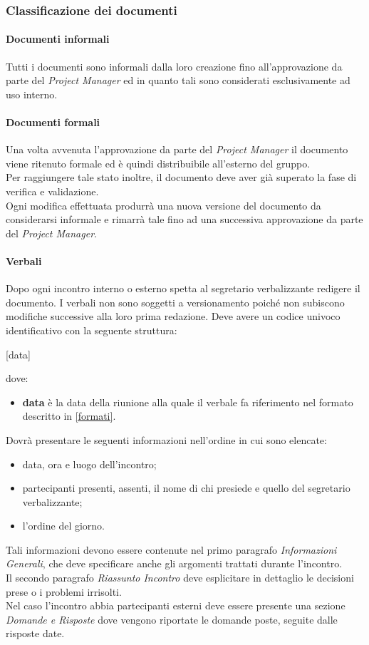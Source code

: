 	\subsubsection{Classificazione dei documenti}
		\paragraph{Documenti informali}\Spazio
		Tutti i documenti sono informali dalla loro creazione fino all'approvazione da parte del \emph{Project Manager} ed in quanto tali sono considerati esclusivamente ad uso interno.
		\paragraph{Documenti formali}\Spazio
		Una volta avvenuta l'approvazione da parte del \emph{Project Manager} il documento viene ritenuto formale ed è quindi distribuibile all'esterno del gruppo.\\
		Per raggiungere tale stato inoltre, il documento deve aver già superato la fase di verifica e validazione. \\
Ogni modifica effettuata produrrà una nuova versione del documento da considerarsi informale e rimarrà tale fino ad una successiva approvazione da parte del \emph{Project Manager}.
		\paragraph{Verbali}\Spazio
		Dopo ogni incontro interno o esterno spetta al segretario verbalizzante redigere il documento. I verbali non sono soggetti a versionamento poiché non subiscono modifiche successive alla loro prima redazione. Deve avere un codice univoco identificativo con la seguente struttura: 
		\newline
		\centerline{[data]} 
		dove: 
    \begin{itemize} 
\item \textbf{data} è la data della riunione alla quale il verbale fa riferimento nel formato descritto in \ref{formati}. 
\end{itemize}
Dovrà presentare le seguenti informazioni nell'ordine in cui sono elencate:
\begin{itemize}
\item data, ora e luogo dell'incontro;
\item partecipanti presenti, assenti, il nome di chi presiede e quello del segretario verbalizzante;
\item l'ordine del giorno.
\end{itemize}
Tali informazioni devono essere contenute nel primo paragrafo \textit{Informazioni Generali}, che deve specificare anche gli argomenti trattati durante l'incontro.\\
Il secondo paragrafo \textit{Riassunto Incontro} deve esplicitare in dettaglio le decisioni prese o i problemi irrisolti.\\
Nel caso l'incontro abbia partecipanti esterni deve essere presente una sezione  \textit{Domande e Risposte} dove vengono riportate le domande poste, seguite dalle risposte date.
